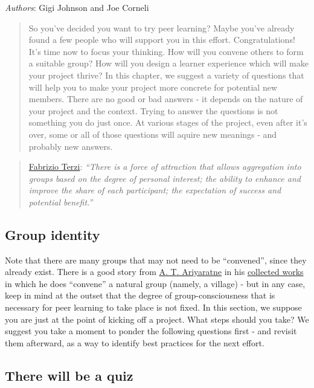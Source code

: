 \emph{Authors}: Gigi Johnson and Joe Corneli

\begin{quote}
So you've decided you want to try peer learning? Maybe you've already
found a few people who will support you in this effort. Congratulations!
It's time now to focus your thinking. How will you convene others to
form a suitable group? How will you design a learner experience which
will make your project thrive? In this chapter, we suggest a variety of
questions that will help you to make your project more concrete for
potential new members. There are no good or bad answers - it depends on
the nature of your project and the context. Trying to answer the
questions is not something you do just once. At various stages of the
project, even after it's over, some or all of those questions will
aquire new meanings - and probably new answers.
\end{quote}
\begin{quote}
\href{http://peeragogy.org/resources/meet-the-team/}{Fabrizio Terzi}:
\emph{``There is a force of attraction that allows aggregation into
groups based on the degree of personal interest; the ability to enhance
and improve the share of each participant; the expectation of success
and potential benefit.''}
\end{quote}
\subsection{Group identity}

Note that there are many groups that may not need to be ``convened'',
since they already exist. There is a good story from
\href{http://www.sarvodayausa.org/learn/a-t-ariyartne/}{A. T.
Ariyaratne} in his
\href{http://www.sarvodaya.org/about/philosophy/collected-works-vol-1/rural-self-help}{collected
works} in which he does ``convene'' a natural group (namely, a village)
- but in any case, keep in mind at the outset that the degree of
group-consciousness that is necessary for peer learning to take place is
not fixed. In this section, we suppose you are just at the point of
kicking off a project. What steps should you take? We suggest you take a
moment to ponder the following questions first - and revisit them
afterward, as a way to identify best practices for the next effort.

\subsection{There will be a quiz}

